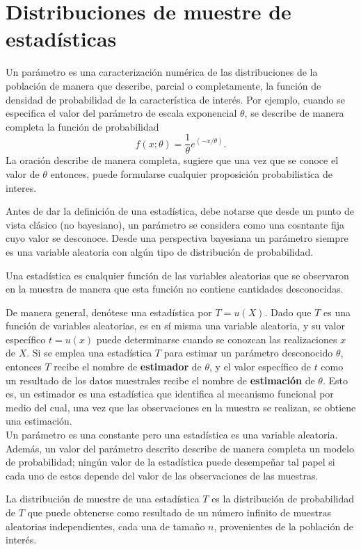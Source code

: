 \setcounter{section}{2}
\section{Distribuciones de muestre de estadísticas}


\begin{def.}
    Un parámetro es una caracterización numérica de las distribuciones de la población de manera que describe, parcial o completamente, la función de densidad de probabilidad de la característica de interés. Por ejemplo, cuando se especifica el valor del parámetro de escala exponencial $\theta$, se describe de manera completa la función de probabilidad
    $$f(x;\theta)=\dfrac{1}{\theta}e^{(-x/\theta)}.$$
    La oración describe de manera completa, sugiere que una vez que se conoce el valor de $\theta$ entonces, puede formularse cualquier proposición probabilistica de interes.
\end{def.}

Antes de dar la definición de una estadística, debe notarse que desde un punto de vista clásico (no bayesiano), un parámetro se considera como una cosntante fija cuyo valor se desconoce. Desde una perspectiva bayesiana un parámetro siempre es una variable aleatoria con algún tipo de distribución de probabilidad.

\begin{def.}
    Una estadística es cualquier función de las variables aleatorias que se observaron en la muestra de manera que esta función no contiene cantidades desconocidas.
\end{def.}

De manera general, denótese una estadística por $T=u(X)$. Dado que $T$ es una función de variables aleatorias, es en sí misma una variable aleatoria, y su valor específico $t=u(x)$ puede determinarse cuando se conozcan las realizaciones $x$ de $X$. Si se emplea una estadística $T$ para estimar un parámetro desconocido $\theta$, entonces $T$ recibe el nombre de \textbf{estimador} de $\theta$, y el valor específico de $t$ como un resultado de los datos muestrales recibe el nombre de \textbf{estimación} de $\theta$. Esto es, un estimador es una estadística que identifica al mecanismo funcional por medio del cual, una vez que las observaciones en la muestra se realizan, se obtiene una estimación.\\

Un parámetro es una constante pero una estadística es una variable aleatoria. Además, un valor del parámetro descrito describe de manera completa un modelo de probabilidad; ningún valor de la estadística puede desempeñar tal papel si cada uno de estos depende del valor de las observaciones de las muestras. 

\begin{def.}
    La distribución de muestre de una estadística $T$ es la distribución de probabilidad de $T$ que puede obtenerse como resultado de un número infinito de muestras aleatorias independientes, cada una de tamaño $n$, provenientes de la población de interés.
\end{def.}

